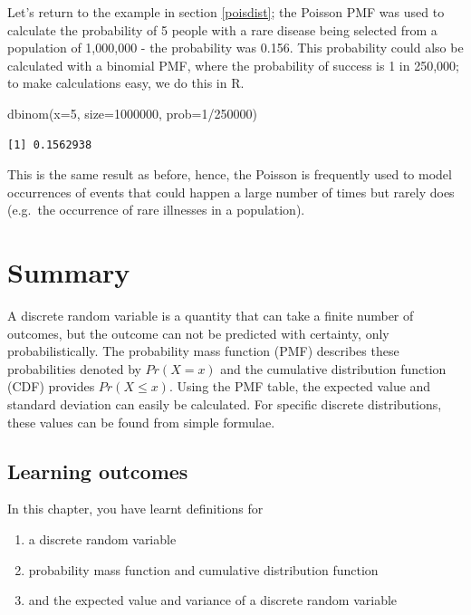 \documentclass[
  oneside]{krantz}
\newenvironment{Shaded}{\begin{snugshade}}{\end{snugshade}}
\newcommand{\AttributeTok}[1]{\textcolor[rgb]{0.77,0.63,0.00}{#1}}
\newcommand{\DecValTok}[1]{\textcolor[rgb]{0.00,0.00,0.81}{#1}}
\newcommand{\FunctionTok}[1]{\textcolor[rgb]{0.00,0.00,0.00}{#1}}
\newcommand{\NormalTok}[1]{#1}
\newcommand{\SpecialCharTok}[1]{\textcolor[rgb]{0.00,0.00,0.00}{#1}}
\begin{document}
Let's return to the example in section \ref{poisdist}; the Poisson PMF was used to calculate the probability of 5 people with a rare disease being selected from a population of 1,000,000 - the probability was 0.156. This probability could also be calculated with a binomial PMF, where the probability of success is 1 in 250,000; to make calculations easy, we do this in R.

\begin{Shaded}
\begin{Highlighting}[]
\FunctionTok{dbinom}\NormalTok{(}\AttributeTok{x=}\DecValTok{5}\NormalTok{, }\AttributeTok{size=}\DecValTok{1000000}\NormalTok{, }\AttributeTok{prob=}\DecValTok{1}\SpecialCharTok{/}\DecValTok{250000}\NormalTok{)}
\end{Highlighting}
\end{Shaded}

\begin{verbatim}
[1] 0.1562938
\end{verbatim}

This is the same result as before, hence, the Poisson is frequently used to model occurrences of events that could happen a large number of times but rarely does (e.g.~the occurrence of rare illnesses in a population).

\hypertarget{SUMdiscrv}{%
\section{Summary}\label{SUMdiscrv}}

A discrete random variable is a quantity that can take a finite number of outcomes, but the outcome can not be predicted with certainty, only probabilistically. The probability mass function (PMF) describes these probabilities denoted by \(Pr(X=x)\) and the cumulative distribution function (CDF) provides \(Pr(X \le x)\). Using the PMF table, the expected value and standard deviation can easily be calculated. For specific discrete distributions, these values can be found from simple formulae.

\hypertarget{learning-outcomes-2}{%
\subsection{Learning outcomes}\label{learning-outcomes-2}}

In this chapter, you have learnt definitions for

\begin{enumerate}
\def\labelenumi{\arabic{enumi}.}
\item
  a discrete random variable
\item
  probability mass function and cumulative distribution function
\item
  and the expected value and variance of a discrete random variable
\end{enumerate}
\end{document}
